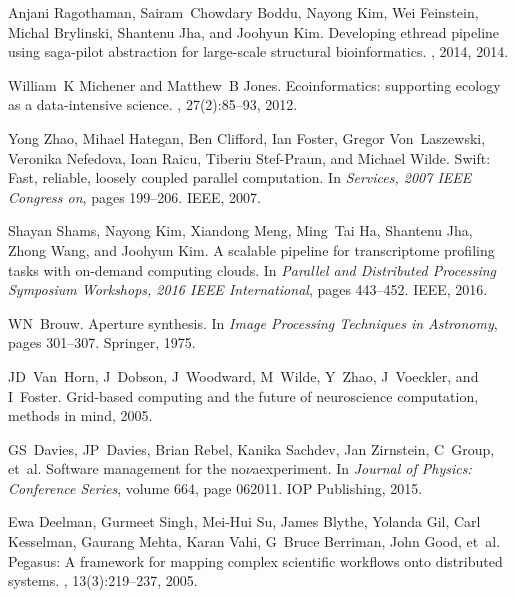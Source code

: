 \begin{thebibliography}{99}
Anjani Ragothaman, Sairam~Chowdary Boddu, Nayong Kim, Wei Feinstein, Michal
  Brylinski, Shantenu Jha, and Joohyun Kim.
\newblock Developing ethread pipeline using saga-pilot abstraction for
  large-scale structural bioinformatics.
, 2014, 2014.

William~K Michener and Matthew~B Jones.
\newblock Ecoinformatics: supporting ecology as a data-intensive science.
, 27(2):85--93, 2012.

Yong Zhao, Mihael Hategan, Ben Clifford, Ian Foster, Gregor Von~Laszewski,
  Veronika Nefedova, Ioan Raicu, Tiberiu Stef-Praun, and Michael Wilde.
\newblock Swift: Fast, reliable, loosely coupled parallel computation.
\newblock In {\em Services, 2007 IEEE Congress on}, pages 199--206. IEEE, 2007.

Shayan Shams, Nayong Kim, Xiandong Meng, Ming~Tai Ha, Shantenu Jha, Zhong Wang,
  and Joohyun Kim.
\newblock A scalable pipeline for transcriptome profiling tasks with on-demand
  computing clouds.
\newblock In {\em Parallel and Distributed Processing Symposium Workshops, 2016
  IEEE International}, pages 443--452. IEEE, 2016.

WN~Brouw.
\newblock Aperture synthesis.
\newblock In {\em Image Processing Techniques in Astronomy}, pages 301--307.
  Springer, 1975.

JD~Van~Horn, J~Dobson, J~Woodward, M~Wilde, Y~Zhao, J~Voeckler, and I~Foster.
\newblock Grid-based computing and the future of neuroscience computation,
  methods in mind, 2005.
  
GS~Davies, JP~Davies, Brian Rebel, Kanika Sachdev, Jan Zirnstein, C~Group,
  et~al.
\newblock Software management for the no$\nu$aexperiment.
\newblock In {\em Journal of Physics: Conference Series}, volume 664, page
  062011. IOP Publishing, 2015.

Ewa Deelman, Gurmeet Singh, Mei-Hui Su, James Blythe, Yolanda Gil, Carl
  Kesselman, Gaurang Mehta, Karan Vahi, G~Bruce Berriman, John Good, et~al.
\newblock Pegasus: A framework for mapping complex scientific workflows onto
  distributed systems.
, 13(3):219--237, 2005.

\end{thebibliography}

% 
